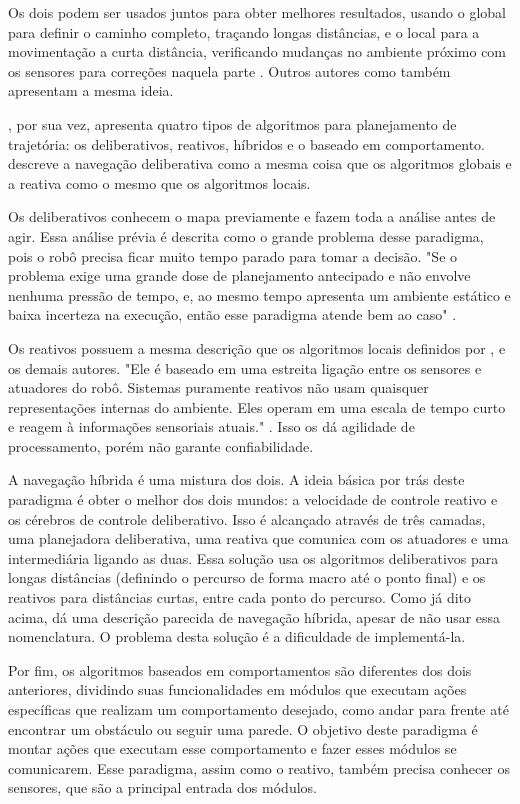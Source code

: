 Os dois podem ser usados juntos para obter melhores resultados, usando o global para definir o caminho completo, traçando longas distâncias, e o local para a movimentação a curta distância, verificando mudanças no ambiente próximo com os sensores para correções naquela parte \cite{Souza2008}. Outros autores como \cite{Secchi2008} também apresentam a mesma ideia.

\cite{Mataric2007}, por sua vez, apresenta quatro tipos de algoritmos para planejamento de trajetória: os deliberativos, reativos, híbridos e o baseado em comportamento. \cite{Guzman2008} descreve a navegação deliberativa como a mesma coisa que os algoritmos globais e a reativa como o mesmo que os algoritmos locais.

Os deliberativos conhecem o mapa previamente e fazem toda a análise antes de agir. Essa análise prévia é descrita como o grande problema desse paradigma, pois o robô precisa ficar muito tempo parado para tomar a decisão. "Se o problema exige uma grande dose de planejamento antecipado e não envolve nenhuma pressão de tempo, e, ao mesmo tempo apresenta um ambiente estático e baixa incerteza na execução, então esse paradigma atende bem ao caso" \cite{Mataric2007}. 

Os reativos possuem a mesma descrição que os algoritmos locais definidos por \cite{Guzman2008}, \cite{Souza2008} e os demais autores. "Ele é baseado em uma estreita ligação entre os sensores e atuadores do robô. Sistemas puramente reativos não usam quaisquer representações internas do ambiente. Eles operam em uma escala de tempo curto e reagem à informações sensoriais atuais." \cite{Mataric2007}. Isso os dá agilidade de processamento, porém não garante confiabilidade.

A navegação híbrida é uma mistura dos dois. A ideia básica por trás deste paradigma é obter o melhor dos dois mundos: a velocidade de controle reativo e os cérebros de controle deliberativo. Isso é alcançado através de três camadas, uma planejadora deliberativa, uma reativa que comunica com os atuadores e uma intermediária ligando as duas. Essa solução usa os algoritmos deliberativos para longas distâncias (definindo o percurso de forma macro até o ponto final) e os reativos para distâncias curtas, entre cada ponto do percurso. Como já dito acima, \cite{Souza2008} dá uma descrição parecida de navegação híbrida, apesar de não usar essa nomenclatura. O problema desta solução é a dificuldade de implementá-la.

Por fim, os algoritmos baseados em comportamentos são diferentes dos dois anteriores, dividindo suas funcionalidades em módulos que executam ações específicas que realizam um comportamento desejado, como andar para frente até encontrar um obstáculo ou seguir uma parede. O objetivo deste paradigma é montar ações que executam esse comportamento e fazer esses módulos se comunicarem. Esse paradigma, assim como o reativo, também precisa conhecer os sensores, que são a principal entrada dos módulos.

